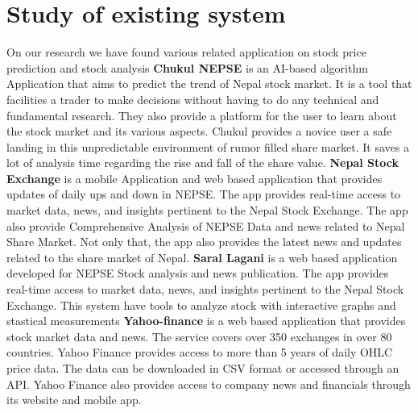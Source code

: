 \documentclass[./main.tex]{subfiles}
\begin{document}
\section*{Study of existing system}
On our research we have found various related application on stock price prediction and stock analysis
\newline
\noindent
\textbf{Chukul NEPSE}
 is an  AI-based algorithm Application that aims to predict the trend of Nepal stock market. 
 It is a tool that facilities a trader to make decisions without having to do any technical and fundamental research. 
 They also provide a platform for the user to learn about the stock market and its various aspects.
 Chukul provides a novice user a safe landing in this unpredictable environment of rumor filled share market. It saves a lot of analysis time regarding the rise and fall of the share value\cite{chukul-nepse}. 
\newline 
\noindent
\textbf{Nepal Stock Exchange}
is a mobile Application and web based application that provides updates of daily ups and down in NEPSE.
The app provides real-time access to market data, news, and insights pertinent to the Nepal Stock Exchange. 
The app also provide Comprehensive Analysis of NEPSE Data and news related to Nepal Share Market.
Not only that, the app also provides the latest news and updates related to the share market of Nepal. 
\cite{Nepal-share}
\newline
\noindent
 \textbf{Saral Lagani} is a web based application developed for NEPSE Stock analysis and news publication. 
The app provides real-time access to market data, news, and insights pertinent to the Nepal Stock Exchange.
This system have tools to analyze stock with interactive graphs and stastical measurements \cite{Saral-Lagani}
 \newline 
 \textbf{Yahoo-finance}
is a web based application that provides stock market data and news. The service covers over 350 exchanges in over 80 countries.
Yahoo Finance provides access to more than 5 years of daily OHLC price data. The data can be downloaded in CSV format or accessed through an API.
Yahoo Finance also provides access to company news and financials through its website and mobile app. \cite{yahoo-finance}
\end{document}
